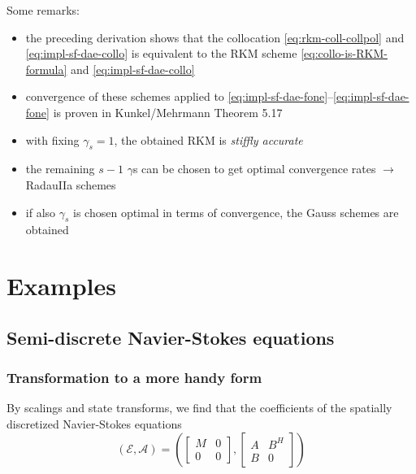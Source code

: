 \documentclass[]{book}
\providecommand{\tightlist}{%
  \setlength{\itemsep}{0pt}\setlength{\parskip}{0pt}}
\theoremstyle{definition}
\theoremstyle{definition}
\theoremstyle{definition}
\theoremstyle{definition}
\theoremstyle{remark}
\begin{document}
Some remarks:

\begin{itemize}
\tightlist
\item
  the preceding derivation shows that the collocation \eqref{eq:rkm-coll-collpol} and \eqref{eq:impl-sf-dae-collo} is equivalent to the RKM scheme \eqref{eq:collo-is-RKM-formula} and \eqref{eq:impl-sf-dae-collo}
\item
  convergence of these schemes applied to \eqref{eq:impl-sf-dae-fone}--\eqref{eq:impl-sf-dae-fone} is proven in Kunkel/Mehrmann Theorem 5.17
\item
  with fixing \(\gamma_s=1\), the obtained RKM is \emph{stiffly accurate}
\item
  the remaining \(s-1\) \(\gamma\)s can be chosen to get optimal convergence rates \(\rightarrow\) RadauIIa schemes
\item
  if also \(\gamma_s\) is chosen optimal in terms of convergence, the Gauss schemes are obtained
\end{itemize}

\hypertarget{examples-1}{%
\chapter{Examples}\label{examples-1}}

\hypertarget{semi-discrete-navier-stokes-equations}{%
\section{Semi-discrete Navier-Stokes equations}\label{semi-discrete-navier-stokes-equations}}

\hypertarget{transformation-to-a-more-handy-form}{%
\subsection{Transformation to a more handy form}\label{transformation-to-a-more-handy-form}}

By scalings and state transforms, we find that the coefficients of the spatially discretized Navier-Stokes equations
\begin{equation}\label{eq:x-lin-sd-nse}
(\mathcal E, \mathcal A )= \left(
\begin{bmatrix} M & 0 \\ 0 & 0 \end{bmatrix}
,
\begin{bmatrix} A & B^H \\ B & 0 \end{bmatrix}
\right )
\end{equation}
\end{document}
